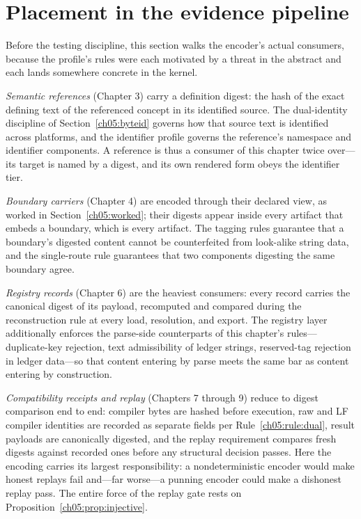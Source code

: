 \section{Placement in the evidence pipeline}\label{ch05:pipeline}

Before the testing discipline, this section walks the encoder's actual
consumers, because the profile's rules were each motivated by a threat
in the abstract and each lands somewhere concrete in the kernel.

\emph{Semantic references} (Chapter 3) carry a definition digest: the
hash of the exact defining text of the referenced concept in its
identified source. The dual-identity discipline of
Section~\ref{ch05:byteid} governs how that source text is identified
across platforms, and the identifier profile governs the reference's
namespace and identifier components. A reference is thus a consumer of
this chapter twice over---its target is named by a digest, and its own
rendered form obeys the identifier tier.

\emph{Boundary carriers} (Chapter 4) are encoded through their declared
view, as worked in Section~\ref{ch05:worked}; their digests appear
inside every artifact that embeds a boundary, which is every artifact.
The tagging rules guarantee that a boundary's digested content cannot
be counterfeited from look-alike string data, and the single-route rule
guarantees that two components digesting the same boundary agree.

\emph{Registry records} (Chapter 6) are the heaviest consumers: every
record carries the canonical digest of its payload, recomputed and
compared during the reconstruction rule at every load, resolution, and
export. The registry layer additionally enforces the parse-side
counterparts of this chapter's rules---duplicate-key rejection, text
admissibility of ledger strings, reserved-tag rejection in ledger
data---so that content entering by parse meets the same bar as content
entering by construction.

\emph{Compatibility receipts and replay} (Chapters 7 through 9) reduce
to digest comparison end to end: compiler bytes are hashed before
execution, raw and LF compiler identities are recorded as separate
fields per Rule~\ref{ch05:rule:dual}, result payloads are canonically
digested, and the replay requirement compares fresh digests against
recorded ones before any structural decision passes. Here the encoding
carries its largest responsibility: a nondeterministic encoder would
make honest replays fail and---far worse---a punning encoder could make
a dishonest replay pass. The entire force of the replay gate rests on
Proposition~\ref{ch05:prop:injective}.


